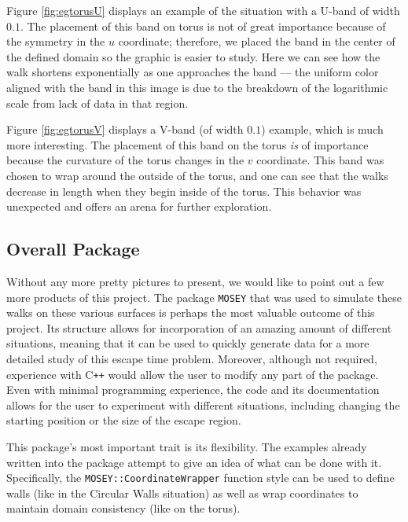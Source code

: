 \documentclass[12pt]{article}
\begin{document}
		Figure \ref{fig:egtorusU} displays an example of the situation with a U-band of width $0.1$.
		The placement of this band on torus is not of great importance because of the symmetry in the $u$ coordinate; therefore, we placed the band in the center of the defined domain so the graphic is easier to study.
		Here we can see how the walk shortens exponentially as one approaches the band --- the uniform color aligned with the band in this image is due to the breakdown of the logarithmic scale from lack of data in that region.
		
		Figure \ref{fig:egtorusV} displays a V-band (of width $0.1$) example, which is much more interesting.
		The placement of this band on the torus \emph{is} of importance because the curvature of the torus changes in the $v$ coordinate.
		This band was chosen to wrap around the outside of the torus, and one can see that the walks decrease in length when they begin inside of the torus.
		This behavior was unexpected and offers an arena for further exploration.
		
	\subsection{Overall Package}
		Without any more pretty pictures to present, we would like to point out a few more products of this project.
		The package \texttt{MOSEY} that was used to simulate these walks on these various surfaces is perhaps the most valuable outcome of this project.
		Its structure allows for incorporation of an amazing amount of different situations, meaning that it can be used to quickly generate data for a more detailed study of this escape time problem.
		Moreover, although not required, experience with C\texttt{++} would allow the user to modify any part of the package.
		Even with minimal programming experience, the code and its documentation allows for the user to experiment with different situations, including changing the starting position or the size of the escape region.
		
		This package's most important trait is its flexibility.
		The examples already written into the package attempt to give an idea of what can be done with it.
		Specifically, the \texttt{MOSEY::CoordinateWrapper} function style can be used to define walls (like in the Circular Walls situation) as well as wrap coordinates to maintain domain consistency (like on the torus).
		
\end{document}
